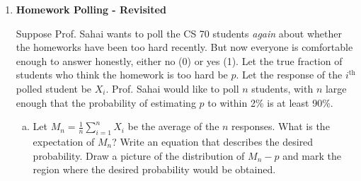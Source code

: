 \documentclass[11pt]{article}
\begin{document}
\maketitle


%
%
%

\begin{enumerate}


\item {\bf Homework Polling - Revisited} 

Suppose Prof. Sahai wants to poll the CS 70 students {\em again} about whether the homeworks have been too hard recently.  But now everyone is comfortable enough to answer honestly, either no (0) or yes (1). Let the true fraction of students who think the homework is too hard be $p$. Let the response of the $i^{\text{th}}$ polled student be $X_i$.  Prof. Sahai would like to poll $n$ students, with $n$ large enough that the probability of estimating $p$ to within 2\% is at least 90\%.

\begin{enumerate}[a)]

\item Let $M_n = \frac{1}{n}\sum_{i=1}^n X_i$ be the average of the $n$ responses. What is the expectation of $M_n$? Write an equation that describes the desired probability. Draw a picture of the distribution of $M_n - p$ and mark the region where the desired probability would be obtained.

\vspace{20mm}

\end{enumerate}


\end{enumerate}
\end{document}
